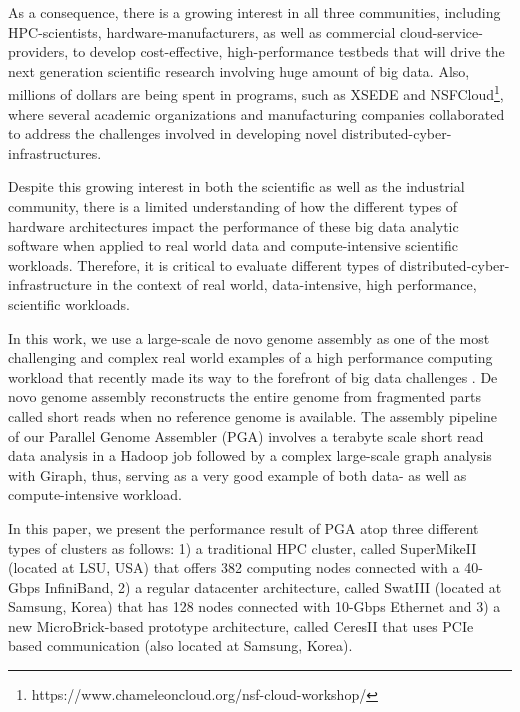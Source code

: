 \documentclass[conference]{IEEEtran}
\begin{document}
As a consequence, there is a growing interest in all three communities, including HPC-scientists, hardware-manufacturers, as well as commercial cloud-service-providers, to develop cost-effective, high-performance testbeds that will drive the next generation scientific research involving huge amount of big data. 
Also, millions of dollars are being spent in programs, such as XSEDE and NSFCloud\footnote{https://www.chameleoncloud.org/nsf-cloud-workshop/}, where several academic organizations and manufacturing companies collaborated to address the challenges involved in developing novel distributed-cyber-infrastructures. 

Despite this growing interest in both the scientific as well as the industrial community, there is a limited understanding of how the different types of hardware architectures impact the performance of these big data analytic software when applied to real world data and compute-intensive scientific workloads. 
Therefore, it is critical to evaluate different types of distributed-cyber-infrastructure in the context of real world, data-intensive, high performance, scientific workloads.   

In this work, we use a large-scale de novo genome assembly as one of the most challenging and complex real world examples of a high performance computing workload that recently made its way to the forefront of big data challenges \cite{bigGenome:graphtraverse} \cite{biggenome:kmerpartition}.
De novo genome assembly reconstructs the entire genome from fragmented parts called short reads when no reference genome is available. 
The assembly pipeline of our Parallel Genome Assembler (PGA) involves a terabyte scale short read data analysis in a Hadoop job followed by a complex large-scale graph analysis with Giraph, thus, serving as a very good example of both data- as well as compute-intensive workload. 

In this paper, we present the performance result of PGA atop three different types of clusters as follows: 
1) a traditional HPC cluster, called SuperMikeII (located at LSU, USA) that offers 382 computing nodes connected with a 40-Gbps InfiniBand, 
2) a regular datacenter architecture, called SwatIII (located at Samsung, Korea) that has 128 nodes connected with 10-Gbps Ethernet and 
3) a new MicroBrick-based prototype architecture, called CeresII that uses PCIe based communication (also located at Samsung, Korea). 
\end{document}
